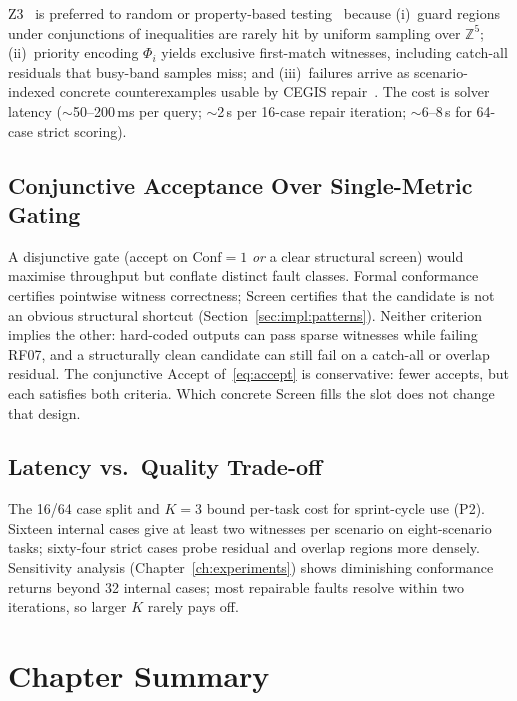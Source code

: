 Z3~\citep{demoura2008z3} is preferred to random or property-based
testing~\citep{claessen2000quickcheck,ammann2016testing} because
(i)~guard regions under conjunctions of inequalities are rarely hit by
uniform sampling over $\mathbb{Z}^5$;
(ii)~priority encoding $\Phi_i$ yields exclusive first-match witnesses,
including catch-all residuals that busy-band samples miss; and
(iii)~failures arrive as scenario-indexed concrete counterexamples usable by
CEGIS repair~\citep{sun2024clover}.
The cost is solver latency ($\sim$50--200\,ms per query; $\sim$2\,s per
16-case repair iteration; $\sim$6--8\,s for 64-case strict scoring).

\subsection{Conjunctive Acceptance Over Single-Metric Gating}

A disjunctive gate (accept on $\mathrm{Conf}=1$ \emph{or} a clear structural
screen) would maximise throughput but conflate distinct fault classes.
Formal conformance certifies pointwise witness correctness; $\mathrm{Screen}$
certifies that the candidate is not an obvious structural shortcut
(Section~\ref{sec:impl:patterns}).
Neither criterion implies the other: hard-coded outputs can pass sparse witnesses while
failing RF07, and a structurally clean candidate can still fail on a catch-all
or overlap residual.
The conjunctive $\mathrm{Accept}$ of~\eqref{eq:accept} is
conservative: fewer accepts, but each satisfies both criteria.
Which concrete $\mathrm{Screen}$ fills the slot does not change that design.

\subsection{Latency vs.\ Quality Trade-off}

The 16/64 case split and $K{=}3$ bound per-task cost for sprint-cycle use
(P2).
Sixteen internal cases give at least two witnesses per scenario on
eight-scenario tasks; sixty-four strict cases probe residual and overlap
regions more densely.
Sensitivity analysis (Chapter~\ref{ch:experiments}) shows diminishing
conformance returns beyond 32 internal cases; most repairable faults resolve
within two iterations, so larger $K$ rarely pays off.

\section*{Chapter Summary}

